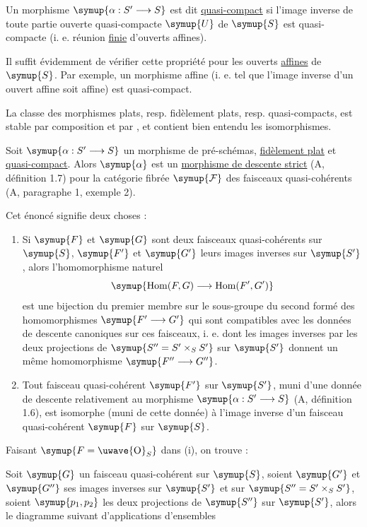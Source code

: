  Un morphisme $\symup{\alpha:S'\longrightarrow S}$ est dit
\uline{quasi-compact} si l'image inverse de toute partie ouverte quasi-compacte
$\symup{U}$ de $\symup{S}$ est quasi-compacte (i. e. réunion \uline{finie} d'ouverts affines).

Il suffit évidemment de vérifier cette propriété pour les ouverts \uline{affines} de
$\symup{S}$. Par exemple, un morphisme affine (i. e. tel que l'image inverse d'un ouvert
affine soit affine) est quasi-compact.

La classe des morphismes plats, resp. fidèlement plats, resp. quasi-compacts,
est stable par composition et par , et contient bien
entendu les isomorphismes.

 Soit $\symup{\alpha:S'\longrightarrow S}$ un morphisme de
pré-schémas, \uline{fidèlement plat} et \uline{quasi-compact}. Alors $\symup{\alpha}$ est un
\uline{morphisme de descente strict} (A, définition 1.7) pour la catégorie
fibrée $\symup{\mathcal F}$ des faisceaux quasi-cohérents (A, paragraphe 1, exemple 2).

Cet énoncé signifie deux choses :
\begin{enumerate}
\item[\textnormal{(i)} ] Si $\symup{F}$ et $\symup{G}$ sont deux faisceaux quasi-cohérents sur $\symup{S}$, $\symup{F'}$ et
$\symup{G'}$ leurs images inverses sur $\symup{S'}$, alors l'homomorphisme naturel
\[
  \symup{\operatorname{Hom}(F,G)\longrightarrow\operatorname{Hom}(F',G')}
\]
est une bijection du premier membre sur le sous-groupe du second formé des
homomorphismes $\symup{F'\longrightarrow G'}$ qui sont compatibles avec les données de
descente canoniques sur ces faisceaux, i. e. dont les images inverses par les
deux projections de $\symup{S''=S'\times_SS'}$ sur $\symup{S'}$ donnent un même homomorphisme
$\symup{F''\longrightarrow G''}$.
\item[\textnormal{(ii)} ] Tout faisceau quasi-cohérent $\symup{F'}$ sur $\symup{S'}$, muni d'une donnée de
descente relativement au morphisme $\symup{\alpha:S'\longrightarrow S}$
(A, définition 1.6), est isomorphe (muni de cette donnée) à l'image inverse
d'un faisceau quasi-cohérent $\symup{F}$ sur $\symup{S}$.
\end{enumerate}
Faisant $\symup{F=\text{\uwave{O}}_S}$ dans (i), on trouve :

 Soit $\symup{G}$ un faisceau quasi-cohérent sur $\symup{S}$, soient
$\symup{G'}$ et $\symup{G''}$ ses images inverses sur $\symup{S'}$ et sur
$\symup{S''=S'\times_SS'}$, soient $\symup{p_1,p_2}$ les deux projections de $\symup{S''}$ sur $\symup{S'}$,
alors le diagramme suivant d'applications d'ensembles

